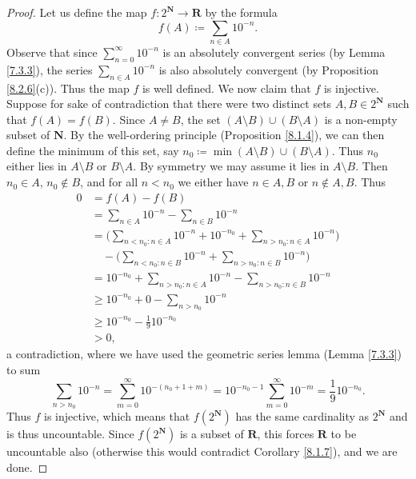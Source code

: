\begin{proof}
    Let us define the map \(f : 2^{\mathbf{N}} \to \mathbf{R}\) by the formula
    \[
        f(A) \coloneqq \sum_{n \in A} 10^{-n}.
    \]
    Observe that since \(\sum_{n = 0}^\infty 10^{-n}\) is an absolutely convergent series (by Lemma \ref{7.3.3}), the series \(\sum_{n \in A} 10^{-n}\) is also absolutely convergent (by Proposition \ref{8.2.6}(c)).
    Thus the map \(f\)  is well defined.
    We now claim that \(f\) is injective.
    Suppose for sake of contradiction that there were two distinct sets \(A, B \in 2^{\mathbf{N}}\) such that \(f(A) = f(B)\).
    Since \(A \neq B\), the set \((A \setminus B) \cup (B \setminus A)\) is a non-empty subset of \(\mathbf{N}\).
    By the well-ordering principle (Proposition \ref{8.1.4}), we can then define the minimum of this set, say \(n_0 \coloneqq \min(A \setminus B) \cup (B \setminus A)\).
    Thus \(n_0\) either lies in \(A \setminus B\) or \(B \setminus A\).
    By symmetry we may assume it lies in \(A \setminus B\).
    Then \(n_0 \in A\), \(n_0 \notin B\), and for all \(n < n_0\) we either have \(n \in A, B\) or \(n \notin A, B\).
    Thus
    \begin{align*}
        0 & = f(A) - f(B)                                                                                 \\
          & = \sum_{n \in A} 10^{-n} - \sum_{n \in B} 10^{-n}                                             \\
          & = \Bigg(\sum_{n < n_0 : n \in A} 10^{-n} + 10^{-n_0} + \sum_{n > n_0 : n \in A} 10^{-n}\Bigg) \\
          & \quad - \Bigg(\sum_{n < n_0 : n \in B} 10^{-n} + \sum_{n > n_0 : n \in B} 10^{-n}\Bigg)       \\
          & = 10^{-n_0} + \sum_{n > n_0 : n \in A} 10^{-n} - \sum_{n > n_0 : n \in B} 10^{-n}             \\
          & \geq 10^{-n_0} + 0 - \sum_{n > n_0} 10^{-n}                                                   \\
          & \geq 10^{-n_0} - \frac{1}{9} 10^{-n_0}                                                        \\
          & > 0,
    \end{align*}
    a contradiction, where we have used the geometric series lemma (Lemma \ref{7.3.3}) to sum
    \[
        \sum_{n > n_0} 10^{-n} = \sum_{m = 0}^\infty 10^{-(n_0 + 1 + m)} = 10^{-n_0 - 1} \sum_{m = 0}^\infty 10^{-m} = \frac{1}{9} 10^{-n_0}.
    \]
    Thus \(f\) is injective, which means that \(f(2^{\mathbf{N}})\) has the same cardinality as \(2^{\mathbf{N}}\) and is thus uncountable.
    Since \(f(2^{\mathbf{N}})\) is a subset of \(\mathbf{R}\), this forces \(\mathbf{R}\) to be uncountable also (otherwise this would contradict Corollary \ref{8.1.7}), and we are done.
\end{proof}

